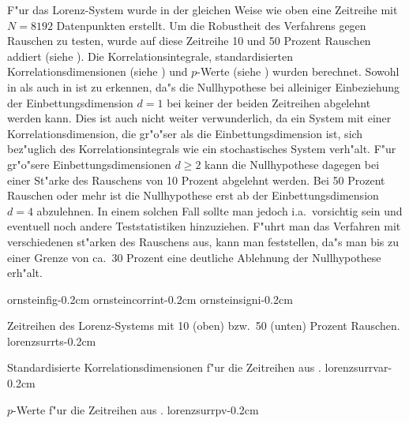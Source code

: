 F"ur das Lorenz-System wurde in der gleichen Weise wie oben eine Zeitreihe mit $N=8192$
Datenpunkten erstellt. Um die Robustheit des Verfahrens gegen Rauschen zu testen, wurde
auf diese Zeitreihe 10 und 50 Prozent Rauschen addiert (siehe ). Die
Korrelationsintegrale, standardisierten Korrelationsdimensionen (siehe
) und $p$-Werte (siehe ) wurden berechnet.
Sowohl in   als auch in  ist zu erkennen, da"s die Nullhypothese bei
alleiniger Einbeziehung  der Einbettungsdimension $d=1$ bei keiner der beiden Zeitreihen abgelehnt werden
kann. Dies ist auch nicht weiter verwunderlich, da ein System mit einer
Korrelationsdimension, die gr"o"ser als die Einbettungsdimension ist, sich bez"uglich des Korrelationsintegrals wie ein
stochastisches System verh"alt. F"ur gr"o"sere Einbettungsdimensionen $d\geq2$ kann die
Nullhypothese dagegen bei einer St"arke des Rauschens von 10 Prozent abgelehnt werden.
Bei 50 Prozent Rauschen oder mehr ist die Nullhypothese erst ab der
Einbettungsdimension $d=4$ abzulehnen. In einem solchen Fall sollte man jedoch i.a.\   vorsichtig sein und
eventuell noch andere Teststatistiken hinzuziehen. F"uhrt man das Verfahren mit
verschiedenen st"arken des Rauschens aus, kann man feststellen, da"s man bis zu einer Grenze
von ca.\  30 Prozent eine deutliche Ablehnung der Nullhypothese erh"alt.

{ornsteinfig}{-0.2cm}
{ornsteincorrint}{-0.2cm}
{ornsteinsigni}{-0.2cm}


{Zeitreihen des Lorenz-Systems mit 10 (oben) bzw.\  50 (unten)
  Prozent Rauschen. 
}{lorenzsurrts}{-0.2cm}

{Standardisierte Korrelationsdimensionen f"ur die Zeitreihen aus .
}{lorenzsurrvar}{-0.2cm}

{$p$-Werte f"ur die Zeitreihen aus .
}{lorenzsurrpv}{-0.2cm}












